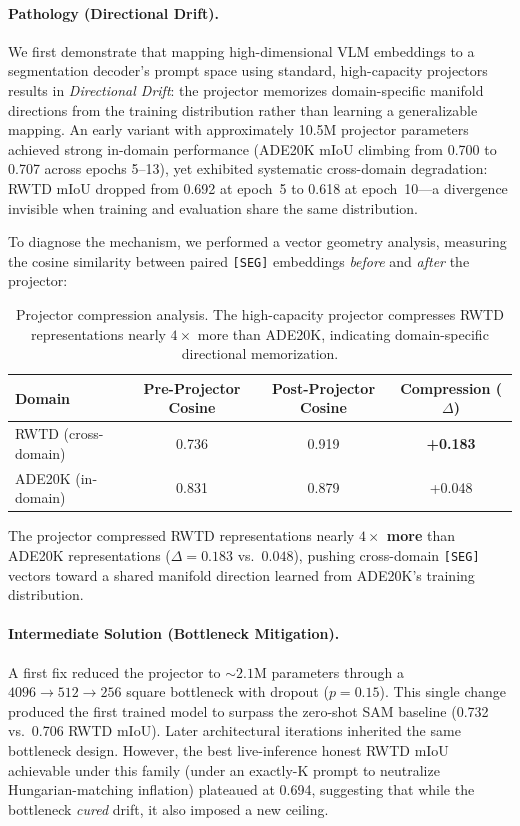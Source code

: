 \documentclass{article}
\begin{document}
\paragraph{Pathology (Directional Drift).}
We first demonstrate that mapping high-dimensional VLM embeddings to a segmentation decoder's prompt space using standard, high-capacity projectors results in \emph{Directional Drift}: the projector memorizes domain-specific manifold directions from the training distribution rather than learning a generalizable mapping. An early variant with approximately 10.5M projector parameters achieved strong in-domain performance (ADE20K mIoU climbing from 0.700 to 0.707 across epochs 5--13), yet exhibited systematic cross-domain degradation: RWTD mIoU dropped from 0.692 at epoch~5 to 0.618 at epoch~10---a divergence invisible when training and evaluation share the same distribution.

To diagnose the mechanism, we performed a vector geometry analysis, measuring the cosine similarity between paired \texttt{[SEG]} embeddings \emph{before} and \emph{after} the projector:

\begin{table}[h]
\centering
\small
\begin{tabular}{lccc}
\toprule
\textbf{Domain} & \textbf{Pre-Projector Cosine} & \textbf{Post-Projector Cosine} & \textbf{Compression ($\Delta$)} \\
\midrule
RWTD (cross-domain) & 0.736 & 0.919 & \textbf{+0.183} \\
ADE20K (in-domain) & 0.831 & 0.879 & +0.048 \\
\bottomrule
\end{tabular}
\caption{Projector compression analysis. The high-capacity projector compresses RWTD representations nearly $4\times$ more than ADE20K, indicating domain-specific directional memorization.}
\label{tab:drift}
\end{table}

The projector compressed RWTD representations nearly \textbf{$4\times$ more} than ADE20K representations ($\Delta = 0.183$ vs.\ $0.048$), pushing cross-domain \texttt{[SEG]} vectors toward a shared manifold direction learned from ADE20K's training distribution.

\paragraph{Intermediate Solution (Bottleneck Mitigation).}
A first fix reduced the projector to ${\sim}2.1$M parameters through a $4096 \to 512 \to 256$ square bottleneck with dropout ($p=0.15$). This single change produced the first trained model to surpass the zero-shot SAM baseline (0.732 vs.\ 0.706 RWTD mIoU). Later architectural iterations inherited the same bottleneck design. However, the best live-inference honest RWTD mIoU achievable under this family (under an exactly-K prompt to neutralize Hungarian-matching inflation) plateaued at 0.694, suggesting that while the bottleneck \emph{cured} drift, it also imposed a new ceiling.
\end{document}
